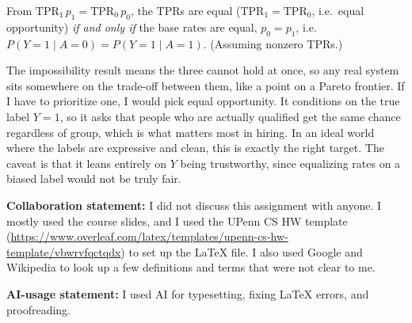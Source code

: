 \documentclass{cisXXX} %
\begin{document}
\HWsubproblem
From $\mathrm{TPR}_1 \, p_1 = \mathrm{TPR}_0 \, p_0$, the TPRs are equal ($\mathrm{TPR}_1 = \mathrm{TPR}_0$, i.e.\ equal opportunity) \emph{if and only if} the base rates are equal, $p_0 = p_1$, i.e.\ $P(Y=1 \mid A=0) = P(Y=1 \mid A=1)$. (Assuming nonzero TPRs.)

\HWsubproblem
The impossibility result means the three cannot hold at once, so any real system sits somewhere on the trade-off between them, like a point on a Pareto frontier. If I have to prioritize one, I would pick equal opportunity. It conditions on the true label $Y=1$, so it asks that people who are actually qualified get the same chance regardless of group, which is what matters most in hiring. In an ideal world where the labels are expressive and clean, this is exactly the right target. The caveat is that it leans entirely on $Y$ being trustworthy, since equalizing rates on a biased label would not be truly fair.

\HWproblem
\HWsubproblem
\textbf{Collaboration statement:} I did not discuss this assignment with anyone. I mostly used the course slides, and I used the UPenn CS HW template (\url{https://www.overleaf.com/latex/templates/upenn-cs-hw-template/vbwrvfqctqdx}) to set up the LaTeX file. I also used Google and Wikipedia to look up a few definitions and terms that were not clear to me.

\HWsubproblem
\textbf{AI-usage statement:} I used AI for typesetting, fixing LaTeX errors, and proofreading.
\end{document}
